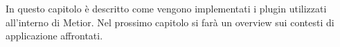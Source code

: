 In questo capitolo \`e descritto come vengono implementati i plugin utilizzati all'interno di Metior.
Nel prossimo capitolo si farà un overview sui contesti di applicazione affrontati.
